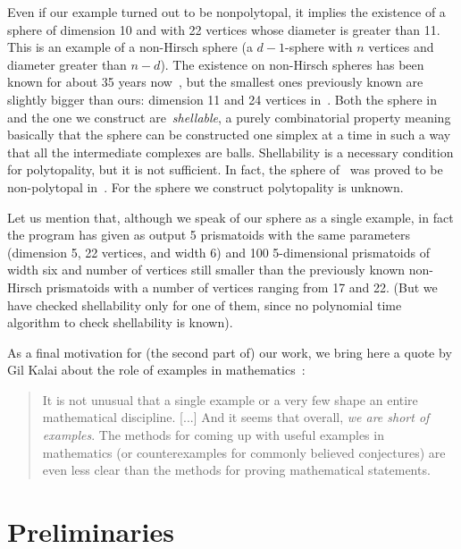 \documentclass[12pt,a4paper]{article}
\theoremstyle{plain}
\theoremstyle{definition}
\begin{document}
Even if our example turned out to be nonpolytopal, it implies the existence of a sphere of dimension 10 and with 22 vertices whose diameter is greater than 11. This is an example of a non-Hirsch sphere (a $d-1$-sphere with $n$ vertices and diameter greater than $n-d$).
The existence on non-Hirsch spheres has been known for about 35 years now~\cite{ManiWalkup}, but the smallest ones previously known are slightly bigger than ours: dimension 11 and 24 vertices in~\cite{ManiWalkup}. Both the sphere in~\cite{ManiWalkup} and the one we construct are~\emph{shellable}, a purely combinatorial property meaning basically that the sphere can be constructed one simplex at a time in such a way that all the intermediate complexes are balls. Shellability is a necessary condition for polytopality, but it is not sufficient. In fact, the sphere of~\cite{ManiWalkup} was proved to be non-polytopal in~\cite{nonPolytopal}. For the sphere we construct polytopality is unknown.

Let us mention that, although we speak of our sphere as a single example, in fact the program has given as output 5 prismatoids with the same parameters (dimension 5, 22 vertices, and width 6) and 100  5-dimensional prismatoids of width six and  number of vertices still smaller than the previously known non-Hirsch prismatoids with a number of vertices ranging from 17 and 22. (But we have checked shellability only for one of them, since no polynomial time algorithm to check shellability is known).

As a final motivation for (the second part of) our work, we bring here a quote by Gil Kalai about the role of examples in mathematics~\cite[p.~769]{examples}:

\begin{quote}
It is not unusual that a single example or a very few shape an entire mathematical discipline. [...] And it seems that overall, \emph{we are short of examples}. The methods for coming up with useful examples in mathematics (or counterexamples for commonly believed conjectures) are even less clear than the methods for proving mathematical statements.
\end{quote}

\section{Preliminaries}
\end{document}
